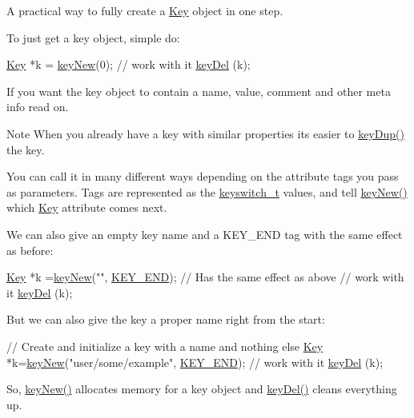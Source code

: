 A practical way to fully create a \hyperlink{classkdb_1_1Key}{Key} object in one step.

To just get a key object, simple do\-:


\begin{DoxyCodeInclude}
\hyperlink{classkdb_1_1Key_a5679f5cae63caddd64a60388b9cc77fa}{Key} *k = \hyperlink{group__key_gad23c65b44bf48d773759e1f9a4d43b89}{keyNew}(0);
\textcolor{comment}{// work with it}
\hyperlink{group__key_ga3df95bbc2494e3e6703ece5639be5bb1}{keyDel} (k);
\end{DoxyCodeInclude}
 If you want the key object to contain a name, value, comment and other meta info read on.

\begin{DoxyNote}{Note}
When you already have a key with similar properties its easier to \hyperlink{group__key_gae6ec6a60cc4b8c1463fa08623d056ce3}{key\-Dup()} the key.
\end{DoxyNote}
You can call it in many different ways depending on the attribute tags you pass as parameters. Tags are represented as the \hyperlink{group__key_ga91fb3178848bd682000958089abbaf40}{keyswitch\-\_\-t} values, and tell \hyperlink{group__key_gad23c65b44bf48d773759e1f9a4d43b89}{key\-New()} which \hyperlink{classkdb_1_1Key}{Key} attribute comes next.

We can also give an empty key name and a K\-E\-Y\-\_\-\-E\-N\-D tag with the same effect as before\-:


\begin{DoxyCodeInclude}
\hyperlink{classkdb_1_1Key_a5679f5cae63caddd64a60388b9cc77fa}{Key} *k =\hyperlink{group__key_gad23c65b44bf48d773759e1f9a4d43b89}{keyNew}(\textcolor{stringliteral}{""}, \hyperlink{group__key_gga91fb3178848bd682000958089abbaf40aa8adb6fcb92dec58fb19410eacfdd403}{KEY\_END}); \textcolor{comment}{// Has the same effect as above}
\textcolor{comment}{// work with it}
\hyperlink{group__key_ga3df95bbc2494e3e6703ece5639be5bb1}{keyDel} (k);
\end{DoxyCodeInclude}
 But we can also give the key a proper name right from the start\-:


\begin{DoxyCodeInclude}
\textcolor{comment}{// Create and initialize a key with a name and nothing else}
\hyperlink{classkdb_1_1Key_a5679f5cae63caddd64a60388b9cc77fa}{Key} *k=\hyperlink{group__key_gad23c65b44bf48d773759e1f9a4d43b89}{keyNew}(\textcolor{stringliteral}{"user/some/example"}, \hyperlink{group__key_gga91fb3178848bd682000958089abbaf40aa8adb6fcb92dec58fb19410eacfdd403}{KEY\_END});
\textcolor{comment}{// work with it}
\hyperlink{group__key_ga3df95bbc2494e3e6703ece5639be5bb1}{keyDel} (k);
\end{DoxyCodeInclude}
 So, \hyperlink{group__key_gad23c65b44bf48d773759e1f9a4d43b89}{key\-New()} allocates memory for a key object and \hyperlink{group__key_ga3df95bbc2494e3e6703ece5639be5bb1}{key\-Del()} cleans everything up.

